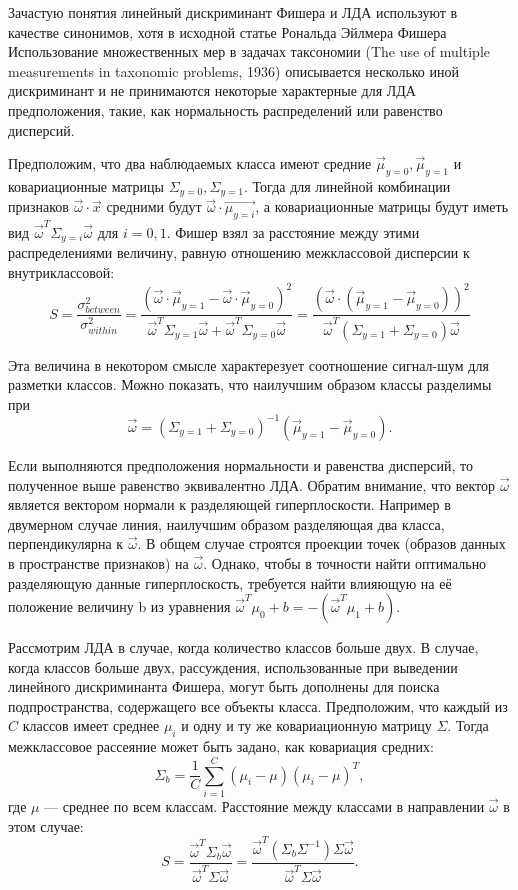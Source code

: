 \documentclass[a4paper,12pt]{report}
\numberwithin{equation}{section}
\begin{document}
Зачастую понятия линейный дискриминант Фишера и ЛДА используют в качестве
синонимов, хотя в исходной статье Рональда Эйлмера Фишера Использование
множественных мер в задачах таксономии (The use of multiple measurements in
taxonomic problems, 1936) описывается несколько иной дискриминант и не
принимаются некоторые характерные для ЛДА предположения, такие, как нормальность
распределений или равенство дисперсий.


Предположим, что два наблюдаемых класса имеют средние
$\vec{\mu}_{y=0},\vec{\mu}_{y=1}$ и ковариационные матрицы
$\Sigma_{y=0},\Sigma_{y=1}$. Тогда для линейной комбинации признаков
$\vec{\omega}\cdot\vec{x}$ средними будут $\vec{\omega}\cdot\vec{\mu_{y=i}}$, а
ковариационные матрицы будут иметь вид $\vec{\omega}^T\Sigma_{y=i}\vec{\omega}$
для $i=0,1$. Фишер взял за расстояние между этими распределениями величину,
равную отношению межклассовой дисперсии к внутриклассовой:
\[S=\frac{\sigma^2_{between}}{\sigma^2_{within}}=\frac{(\vec{\omega}\cdot\vec{\mu}_{y=1}-\vec{\omega}\cdot\vec{\mu}_{y=0})^2}{\vec{\omega}^T\Sigma_{y=1}\vec{\omega}+\vec{\omega}^T\Sigma_{y=0}\vec{\omega}}=\frac{(\vec{\omega}\cdot(\vec{\mu}_{y=1}-\vec{\mu}_{y=0}))^2}{\vec{\omega}^T(\Sigma_{y=1}+\Sigma_{y=0})\vec{\omega}} \]

Эта величина в некотором смысле характерезует соотношение сигнал-шум для
разметки классов. Можно показать, что наилучшим образом классы разделимы при
\[ \vec{\omega}=(\Sigma_{y=1}+\Sigma_{y=0})^{-1}(\vec{\mu}_{y=1}-\vec{\mu}_{y=0}). \]

Если выполняются предположения нормальности и равенства дисперсий, то полученное
выше равенство эквивалентно ЛДА. Обратим внимание, что вектор $\vec{\omega}$
является вектором нормали к разделяющей гиперплоскости. Например в двумерном
случае линия, наилучшим образом разделяющая два класса, перпендикулярна к
$\vec{\omega}$. В общем случае строятся проекции точек (образов данных в
пространстве признаков) на $\vec{\omega}$. Однако, чтобы в точности найти
оптимально разделяющую данные гиперплоскость, требуется найти влияющую на её
положение величину b из уравнения
$\vec{\omega}^T\mu_0+b=-(\vec{\omega}^T\mu_1+b)$.


Рассмотрим ЛДА в случае, когда количество классов больше двух. В случае, когда
классов больше двух, рассуждения, использованные при выведении линейного
дискриминанта Фишера, могут быть дополнены для поиска подпространства,
содержащего все объекты класса. Предположим, что каждый из $C$ классов имеет
среднее $\mu_i$ и одну и ту же ковариационную матрицу $\Sigma$. Тогда
межклассовое рассеяние может быть задано, как ковариация средних:
\[ \Sigma_b=\frac{1}{C}\sum_{i=1}^C (\mu_i-\mu)(\mu_i-\mu)^T, \]
где $\mu$ — среднее по всем классам. Расстояние между классами в направлении
$\vec{\omega}$ в этом случае:
\[ S=\frac{\vec{\omega}^T\Sigma_b\vec{\omega}}{\vec{\omega}^T\Sigma\vec{\omega}}=\frac{\vec{\omega}^T(\Sigma_b\Sigma^{-1})\Sigma\vec{\omega}}{\vec{\omega}^T\Sigma\vec{\omega}}. \]
\end{document}
